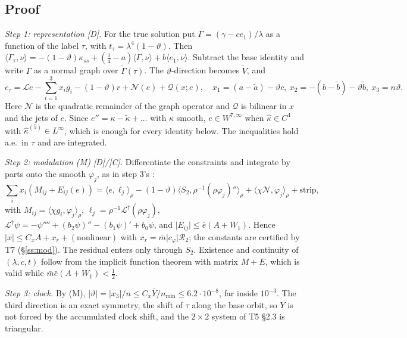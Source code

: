 \documentclass[11pt]{article}
\theoremstyle{definition}
\theoremstyle{remark}
\newcommand{\fn}[1]{\texttt{\detokenize{#1}}}
\newcommand{\tC}{\textnormal{\textsc{[C]}}}
\newcommand{\tD}{\textnormal{\textsc{[D]}}}
\newcommand{\ip}[2]{\langle #1,#2\rangle}
\newcommand{\abs}[1]{\lvert #1\rvert}
\newcommand{\kt}{\tilde\kappa}
\newcommand{\Gt}{\tilde\Gamma}
\newcommand{\Yb}{\bar Y}
\newcommand{\cL}{\mathcal L}
\newcommand{\cN}{\mathcal N}
\newcommand{\cQ}{\mathcal Q}
\newcommand{\cR}{\mathcal R}
\begin{document}
\subsection{Proof}\label{ss:proofP2}
\emph{Step 1: representation \tD.} For the true solution put $\Gamma=(\gamma-ce_1)/\lambda$ as a function of the label $\tau$, with $t_\tau=\lambda^4(1-\vartheta)$. Then $\ip{\Gamma_\tau}\nu=-(1-\vartheta)\kappa_{ss}+(\frac14-a)\ip\Gamma\nu+b\ip{e_1}\nu$. Subtract the base identity and write $\Gamma$ as a normal graph over $\Gt(\tau)$. The $\vartheta$-direction becomes $\tilde V$, and
\[
e_\tau=\cL e-\sum_{i=1}^3x_ig_i-(1-\vartheta)r+\cN(e)+\cQ(x;e),\quad x_1=(a-\tilde a)-\vartheta c,\ x_2=-(b-\tilde b)-\vartheta\tilde b,\ x_3=n\vartheta .
\]
Here $\cN$ is the quadratic remainder of the graph operator and $\cQ$ is bilinear in $x$ and the jets of $e$. Since $e''=\kappa-\kt+\dots$ with $\kappa$ smooth, $e\in W^{7,\infty}$ when $\hat\kappa\in C^4$ with $\hat\kappa^{(5)}\in L^\infty$, which is enough for every identity below. The inequalities hold a.e.\ in $\tau$ and are integrated.

\emph{Step 2: modulation (M) \tD/\tC.} Differentiate the constraints and integrate by parts onto the smooth $\varphi_j$, as in step 3's \fn{MOD_IBP}:
\[
\sum_ix_i(M_{ij}+E_{ij}(e))=\ip e{\ell_j}_\rho-(1-\vartheta)\ip{S_2}{\rho^{-1}(\rho\varphi_j)''}_\rho+\ip{\chi\cN}{\varphi_j}_\rho+\text{strip},
\]
with $M_{ij}=\ip{\chi g_i}{\varphi_j}_\rho$, $\ell_j=\rho^{-1}\cL^\dagger(\rho\varphi_j)$, $\cL^\dagger\psi=-\psi''''+(b_2\psi)''-(b_1\psi)'+b_0\psi$, and $\abs{E_{ij}}\le\bar e(A+W_1)$. Hence $\abs x\le C_xA+x_r+(\text{nonlinear})$ with $x_r=\bar m\abs{c_\varphi}\cR_2$; the constants are certified by T7 (\S\ref{ss:mod}). The residual enters only through $S_2$. Existence and continuity of $(\lambda,c,t)$ follow from the implicit function theorem with matrix $M+E$, which is valid while $\bar m\bar e(A+W_1)<\frac12$.

\emph{Step 3: clock.} By (M), $\abs\vartheta=\abs{x_3}/n\le C_x\Yb/n_{\min}\le6.2\cdot10^{-8}$, far inside $10^{-3}$. The third direction is an exact symmetry, the shift of $\tau$ along the base orbit, so $Y$ is not forced by the accumulated clock shift, and the $2\times2$ system of T5 \S2.3 is triangular.
\end{document}
